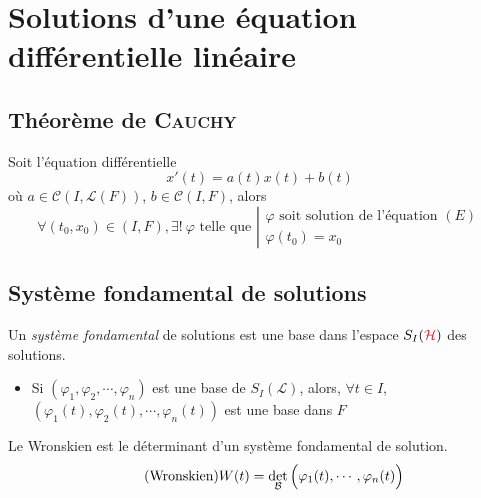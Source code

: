 \documentclass[11pt,a4paper,fleqn,pdftex]{report}
\begin{document}
\section{Solutions d'une équation différentielle linéaire} %
\label{sec:solutions_d_une_equation_differentielle_lineaire}
\subsection{Théorème de \textsc{Cauchy}} %
\label{sub:theoreme_de_Cauchy}
\begin{itheorem}\label{th:CauchyLipschitz}
Soit l'équation différentielle 
\begin{equation}\tag{$E$}
 x'(t) = a(t) x(t) + b(t)
\end{equation}
où $a \in \mathcal{C}\left( I,\mathscr{L}(F)\right)$, $b\in \mathcal{C}(I,F)$, alors
\begin{equation}
    \forall (t_0,x_0) \in (I,F), \exists ! \: \varphi \text{ telle que }
    \left|
    \begin{array}{l}
        \varphi \text{ soit solution de l'équation }(E)\\
        \varphi(t_0)=x_0
    \end{array}
    \right.
\end{equation}
\end{itheorem}
\subsection{Système fondamental de solutions} %
\label{sub:systeme_fondamental_de_solutions}
\begin{dfn}
Un \emph{système fondamental} de solutions est une base dans l'espace $S_I(\textcolor{Red}{\mathcal{H}})$ des solutions.
\end{dfn}
%
\begin{prop}
    \begin{itemize}
        \item Si $(\varphi_1, \varphi_2, \cdots , \varphi_n)$ est une base de $S_I(\mathscr{L})$, alors, $\forall t \in I$, $\left( \varphi_1(t), \varphi_2(t), \cdots , \varphi_n(t) \right)
$ est une base dans $ F$
    \end{itemize}
\end{prop}
%
\begin{dfn}[Wronskien]
Le Wronskien est le déterminant d'un système fondamental de solution. 
\begin{equation}\label{Wronskien}\tag{Wronskien}
  W(t) = \det_\mathcal{B}\left( \vphantom{{3^3}^3} \varphi_1(t),\cdots , \varphi_n(t) \right)
\end{equation}
\end{dfn}
\end{document}
